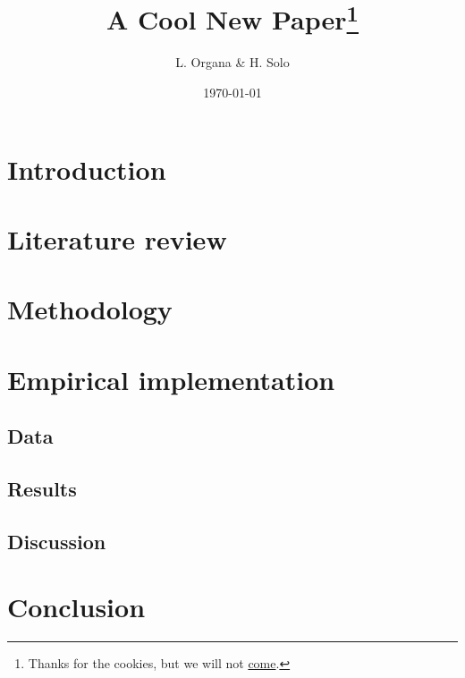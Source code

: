 \documentclass{article}
\title{A Cool New Paper\footnote{Thanks for the cookies, but we will not \href{https://thatisevil.wordpress.com/2013/06/17/come-to-the-dark-side-we-have-cookies/}{come}.}}
\author{L. Organa \& H. Solo}
\date{\today}
\begin{document}
\maketitle

\begin{abstract}
	\lipsum[1]
\end{abstract}

\section{Introduction}
	\lipsum[1-4]
\section{Literature review}
	\lipsum[1-3]
\section{Methodology}
	\lipsum[1-2]
\section{Empirical implementation}
	\lipsum[1-4]
\subsection{Data}
	\lipsum[1-2]
\subsection{Results}
	\lipsum[1-1]
\subsection{Discussion}
	\lipsum[1-3]
\section{Conclusion}
	\lipsum[1-4]
\end{document}
